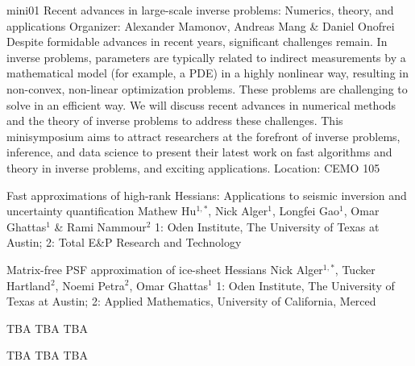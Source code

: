 \mini
{mini01}
{Recent advances in large-scale inverse problems: Numerics, theory, and applications}
{Organizer: Alexander Mamonov, Andreas Mang \& Daniel Onofrei}
{Despite formidable advances in recent years, significant challenges remain. In inverse problems, parameters are typically related to indirect measurements by a mathematical model (for example, a PDE) in a highly nonlinear way, resulting in non-convex, non-linear optimization problems. These problems are challenging to solve in an efficient way. We will discuss recent advances in numerical methods and the theory of inverse problems to address these challenges. This minisymposium aims to attract researchers at the forefront of inverse problems, inference, and data science to present their latest work on fast algorithms and theory in inverse problems, and exciting applications.}
{Location: CEMO 105}


\begin{talks}
\item\talk
{Fast approximations of high-rank Hessians: Applications to seismic inversion and uncertainty quantification}
{Mathew Hu$^{1,*}$, Nick Alger$^{1}$, Longfei Gao$^{1}$, Omar Ghattas$^{1}$ \& Rami Nammour$^{2}$}
{1: Oden Institute, The University of Texas at Austin; 2: Total E\&P Research and Technology}
\item\talk
{Matrix-free PSF approximation of ice-sheet Hessians}
{Nick Alger$^{1,*}$, Tucker Hartland$^{2}$, Noemi Petra$^{2}$, Omar Ghattas$^{1}$}
{1: Oden Institute, The University of Texas at Austin; 2: Applied Mathematics, University of California, Merced}
\item\talk
{TBA}
{TBA}
{TBA}
\item\talk
{TBA}
{TBA}
{TBA}
\end{talks}

\room

